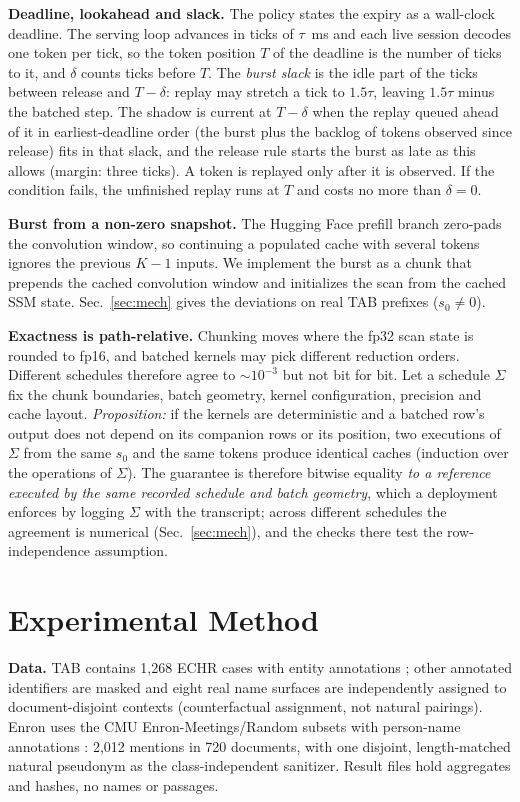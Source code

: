 \documentclass[conference]{IEEEtran}
\begin{document}
\textbf{Deadline, lookahead and slack.} The policy states the expiry as a wall-clock deadline. The serving loop
advances in ticks of $\tau$~ms and each live session decodes one token per tick, so the token position $T$ of
the deadline is the number of ticks to it, and $\delta$ counts ticks before $T$. The \emph{burst slack} is the
idle part of the ticks between release and $T{-}\delta$: replay may stretch a tick to $1.5\tau$, leaving $1.5\tau$
minus the batched step. The shadow is current at $T{-}\delta$ when the replay queued
ahead of it in earliest-deadline order (the burst plus the backlog of tokens observed since release) fits in
that slack, and the release rule starts the burst as late as this allows (margin: three ticks). A token is
replayed only after it is observed. If the condition fails, the unfinished replay runs at $T$ and costs no more
than $\delta{=}0$.

\textbf{Burst from a non-zero snapshot.} The Hugging Face prefill branch zero-pads the convolution window, so
continuing a populated cache with several tokens ignores the previous $K{-}1$ inputs. We implement the burst
as a chunk that prepends the cached convolution window and initializes the scan from the cached SSM state.
Sec.~\ref{sec:mech} gives the deviations on real TAB prefixes ($s_0\neq0$).

\textbf{Exactness is path-relative.} Chunking moves where the fp32 scan state is rounded to fp16, and
batched kernels may pick different reduction orders. Different schedules therefore agree to $\sim$$10^{-3}$
but not bit for bit. Let a schedule $\Sigma$ fix the chunk boundaries, batch geometry, kernel configuration,
precision and cache layout. \emph{Proposition:} if the kernels are deterministic and a batched row's output does
not depend on its companion rows or its position, two executions of $\Sigma$ from the same $s_0$ and the same
tokens produce identical caches (induction over the operations of $\Sigma$). The guarantee is therefore bitwise
equality \emph{to a reference executed by the same recorded schedule and batch geometry}, which a deployment
enforces by logging $\Sigma$ with the transcript; across different schedules the agreement is numerical
(Sec.~\ref{sec:mech}), and the checks there test the row-independence assumption.

\section{Experimental Method}
\textbf{Data.} TAB contains 1{,}268 ECHR cases with entity annotations \cite{tab}; other annotated
identifiers are masked and eight real name surfaces are independently assigned to document-disjoint
contexts (counterfactual assignment, not natural pairings). Enron uses the CMU Enron-Meetings/Random subsets
with person-name annotations \cite{enronner}: 2{,}012 mentions in 720 documents, with one disjoint,
length-matched natural pseudonym as the class-independent sanitizer. Result files hold aggregates and hashes,
no names or passages.
\end{document}
